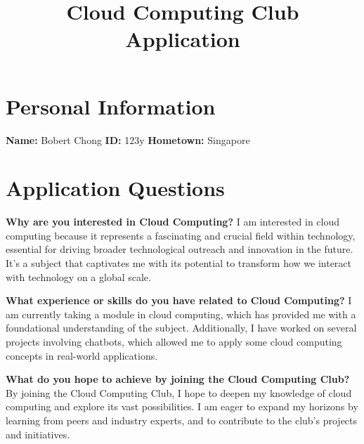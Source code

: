\documentclass{article}
\title{Cloud Computing Club Application}
\begin{document}
\maketitle

\section*{Personal Information}
\textbf{Name:} Bobert Chong
\textbf{ID:} 123y
\textbf{Hometown:} Singapore

\section*{Application Questions}
\textbf{Why are you interested in Cloud Computing?}
I am interested in cloud computing because it represents a fascinating and crucial field within technology, essential for driving broader technological outreach and innovation in the future. It's a subject that captivates me with its potential to transform how we interact with technology on a global scale.

\textbf{What experience or skills do you have related to Cloud Computing?}
I am currently taking a module in cloud computing, which has provided me with a foundational understanding of the subject. Additionally, I have worked on several projects involving chatbots, which allowed me to apply some cloud computing concepts in real-world applications.

\textbf{What do you hope to achieve by joining the Cloud Computing Club?}
By joining the Cloud Computing Club, I hope to deepen my knowledge of cloud computing and explore its vast possibilities. I am eager to expand my horizons by learning from peers and industry experts, and to contribute to the club's projects and initiatives.
\end{document}

